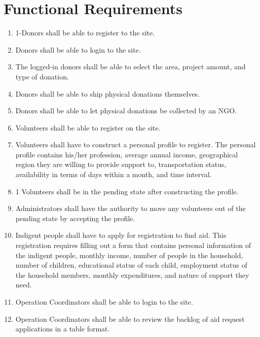 \documentclass[a4paper,12pt]{report}
\begin{document}
	\chapter{Functional Requirements}
	\begin{enumerate}
		 	\item1-Donors shall be able to register to the site.
		
			\item Donors shall be able to login to the site.
			\item The logged-in donors shall be able to select the area, project amount, and type of donation.
			
			\item Donors shall be able to ship physical donations themselves.
			
			\item Donors shall be able to let physical donations be collected by an NGO.
			
			\item Volunteers shall be able to register on the site.
			
			\item Volunteers shall have to construct a personal profile to register. The personal profile contains his/her profession, average annual income, geographical region they are willing to provide support to, transportation status, availability in terms of days within a month, and time interval.
			
			\item1 Volunteers shall be in the pending state after constructing the profile.
			
			\item  Administrators shall have the authority to move any volunteers out of the pending state by accepting the profile.
			
			\item Indigent people shall have to apply for registration to find aid. This registration requires filling out a form that contains personal information of the indigent people, monthly income, number of people in the household, number of children, educational status of each child, employment status of the household members, monthly expenditures, and nature of support they need.
			
			\item Operation Coordinators shall be able to login to the site.
			
			\item Operation Coordinators shall be able to review the backlog of aid request applications in a table format.
			

\end{enumerate}
\end{document}
